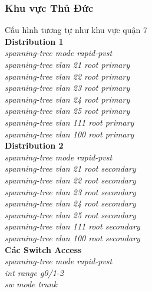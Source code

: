 \documentclass[a4paper, 12pt]{article}
\begin{document}
\subsubsection{Khu vực Thủ Đức}
\hspace*{1cm}Cấu hình tương tự như khu vực quận 7\\
\hspace*{1cm}\textbf{Distribution 1}\\
\hspace*{2cm}\textit{spanning-tree mode rapid-pvst\\
\hspace*{2cm}spanning-tree vlan 21 root primary\\
\hspace*{2cm}spanning-tree vlan 22 root primary\\
\hspace*{2cm}spanning-tree vlan 23 root primary\\
\hspace*{2cm}spanning-tree vlan 24 root primary\\
\hspace*{2cm}spanning-tree vlan 25 root primary\\
\hspace*{2cm}spanning-tree vlan 111 root primary\\
\hspace*{2cm}spanning-tree vlan 100 root primary\\}
\hspace*{1cm}\textbf{Distribution 2}\\
\hspace*{2cm}\textit{spanning-tree mode rapid-pvst\\
\hspace*{2cm}spanning-tree vlan 21 root secondary\\
\hspace*{2cm}spanning-tree vlan 22 root secondary\\
\hspace*{2cm}spanning-tree vlan 23 root secondary\\
\hspace*{2cm}spanning-tree vlan 24 root secondary\\
\hspace*{2cm}spanning-tree vlan 25 root secondary\\
\hspace*{2cm}spanning-tree vlan 111 root secondary\\
\hspace*{2cm}spanning-tree vlan 100 root secondary\\}
\hspace*{1cm}\textbf{Các Switch Access}\\
\hspace*{2cm}\textit{spanning-tree mode rapid-pvst\\
\hspace*{2cm}int range g0/1-2\\
\hspace*{2cm}sw mode trunk\\}
\end{document}
